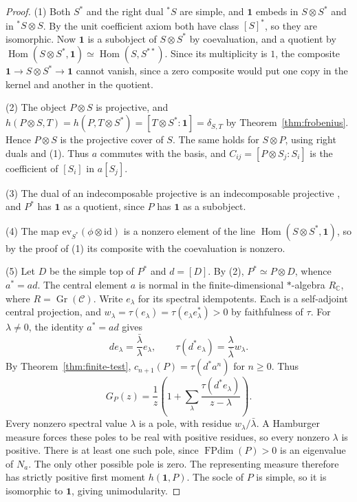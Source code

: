 \documentclass[11pt,reqno]{amsart}
\theoremstyle{definition}
\newcommand{\Hom}{\operatorname{Hom}}
\newcommand{\FPdim}{\operatorname{FPdim}}
\newcommand{\one}{\mathbf 1}
\newcommand{\C}{\mathcal C}
\newcommand{\CC}{\mathbb C}
\DeclareMathOperator{\Gr}{Gr}
\begin{document}
\begin{proof}
(1) Both $S^*$ and the right dual ${}^*S$ are simple, and $\one$ embeds in $S\otimes S^*$ and in ${}^*S\otimes S$. By the unit coefficient axiom both have class $[S]^*$, so they are isomorphic. Now $\one$ is a subobject of $S\otimes S^*$ by coevaluation, and a quotient by $\Hom(S\otimes S^*,\one)\simeq\Hom(S,S^{**})$. Since its multiplicity is $1$, the composite $\one\to S\otimes S^*\to\one$ cannot vanish, since a zero composite would put one copy in the kernel and another in the quotient.

(2) The object $P\otimes S$ is projective, and $h(P\otimes S,T)=h(P,T\otimes S^*)=[T\otimes S^*:\one]=\delta_{S,T}$ by Theorem~\ref{thm:frobenius}. Hence $P\otimes S$ is the projective cover of $S$. The same holds for $S\otimes P$, using right duals and (1). Thus $a$ commutes with the basis, and $C_{ij}=[P\otimes S_j:S_i]$ is the coefficient of $[S_i]$ in $a[S_j]$.

(3) The dual of an indecomposable projective is an indecomposable projective \cite[Proposition~6.1.3]{EGNO}, and $P^*$ has $\one$ as a quotient, since $P$ has $\one$ as a subobject.

(4) The map $\mathrm{ev}_{S^*}(\phi\otimes\mathrm{id})$ is a nonzero element of the line $\Hom(S\otimes S^*,\one)$, so by the proof of (1) its composite with the coevaluation is nonzero.

(5) Let $D$ be the simple top of $P^*$ and $d=[D]$. By (2), $P^*\simeq P\otimes D$, whence $a^*=ad$. The central element $a$ is normal in the finite-dimensional $*$-algebra $R_{\CC}$, where $R=\Gr(\C)$. Write $e_\lambda$ for its spectral idempotents. Each is a self-adjoint central projection, and $w_\lambda=\tau(e_\lambda)=\tau(e_\lambda e_\lambda^*)>0$ by faithfulness of $\tau$. For $\lambda\ne0$, the identity $a^*=ad$ gives
\[
 d e_\lambda=\frac{\bar\lambda}{\lambda}e_\lambda,\qquad
 \tau(d^*e_\lambda)=\frac{\lambda}{\bar\lambda}w_\lambda .
\]
By Theorem~\ref{thm:finite-test}, $c_{n+1}(P)=\tau(d^*a^n)$ for $n\ge0$. Thus
\[
 G_P(z)=\frac{1}{z}\left(1+\sum_\lambda
                    \frac{\tau(d^*e_\lambda)}{z-\lambda}\right).
\]
Every nonzero spectral value $\lambda$ is a pole, with residue $w_\lambda/\bar\lambda$. A Hamburger measure forces these poles to be real with positive residues, so every nonzero $\lambda$ is positive. There is at least one such pole, since $\FPdim(P)>0$ is an eigenvalue of $N_a$. The only other possible pole is zero. The representing measure therefore has strictly positive first moment $h(\one,P)$. The socle of $P$ is simple, so it is isomorphic to $\one$, giving unimodularity.
\end{proof}
\end{document}
